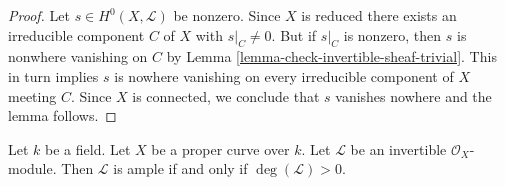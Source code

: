 \begin{proof}
Let $s \in H^0(X, \mathcal{L})$ be nonzero. Since $X$ is reduced there exists
an irreducible component $C$ of $X$ with $s|_C \not = 0$.
But if $s|_C$ is nonzero, then
$s$ is nonwhere vanishing on $C$ by
Lemma \ref{lemma-check-invertible-sheaf-trivial}.
This in turn implies $s$ is nowhere vanishing on
every irreducible component of $X$ meeting $C$.
Since $X$ is connected, we conclude that $s$
vanishes nowhere and the lemma follows.
\end{proof}

\begin{lemma}
\label{lemma-ample-curve}
Let $k$ be a field. Let $X$ be a proper curve over $k$.
Let $\mathcal{L}$ be an invertible $\mathcal{O}_X$-module.
Then $\mathcal{L}$ is ample if and only if $\deg(\mathcal{L}) > 0$.
\end{lemma}

